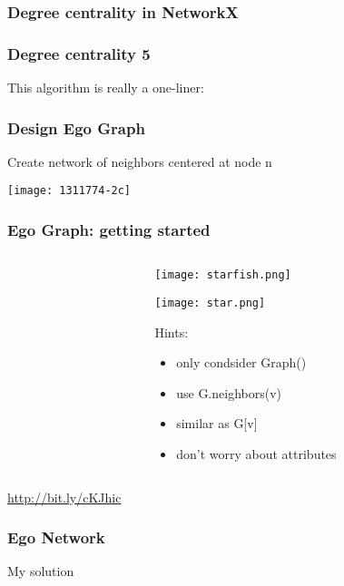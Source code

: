 \documentclass[xcolor=dvipsnames, 9pt]{beamer}
\begin{document}
\begin{frame}
\tiny
\frametitle{Degree centrality in NetworkX}

\end{frame}


\begin{frame}
\frametitle{Degree centrality 5}
This algorithm is really a one-liner:

\end{frame}

\begin{frame}
\frametitle{Design Ego Graph}
\centerline{Create network of neighbors centered at node n}
\centerline{\texttt{[image: 1311774-2c]}}
\end{frame}


\begin{frame}
\frametitle{Ego Graph: getting started}
\begin{columns}
\begin{column}{0.6\textwidth}
\small

\end{column}
\begin{column}{0.4\textwidth}
\centerline{\texttt{[image: starfish.png]}}
\centerline{\texttt{[image: star.png]}}

Hints:
\begin{itemize}
\item only condsider Graph()
\item use G.neighbors(v) 
\item similar as G[v]
\item don't worry about attributes
\end{itemize}

\end{column}
\end{columns}
\url{http://bit.ly/cKJhic}
\end{frame}

\begin{frame}
\frametitle{Ego Network}

My solution

\end{frame}
\end{document}
